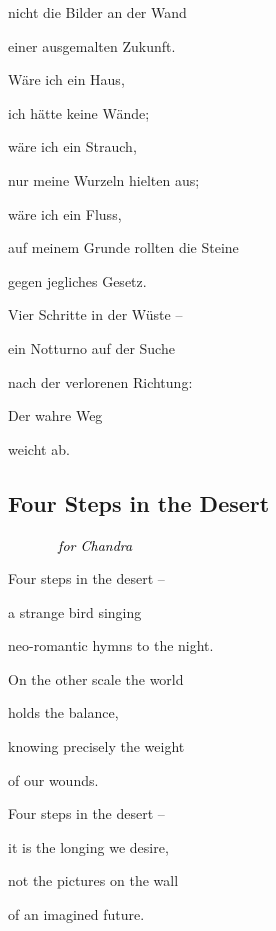 \documentclass[a4paper]{article}
\begin{document}
nicht die Bilder an der Wand

einer ausgemalten Zukunft.


\bigskip

Wäre ich ein Haus,

ich hätte keine Wände;

wäre ich ein Strauch,

nur meine Wurzeln hielten aus;

wäre ich ein Fluss,

auf meinem Grunde rollten die Steine

gegen jegliches Gesetz.


\bigskip

Vier Schritte in der Wüste – 

ein Notturno auf der Suche

nach der verlorenen Richtung:

Der wahre Weg

weicht ab.


\bigskip


\bigskip

\clearpage\subsection[Four Steps in the Desert]{\color{black} Four Steps in the Desert}
\emph{\textup{\textcolor{black}{\ \  \ \ \ \ \ }}}\emph{\textcolor{black}{for Chandra}}


\bigskip

{\color{black}
Four steps in the desert – }

{\color{black}
a strange bird singing}

{\color{black}
neo-romantic hymns to the night.}


\bigskip

{\color{black}
On the other scale the world}

{\color{black}
holds the balance,}

{\color{black}
knowing precisely the weight}

{\color{black}
of our wounds.}


\bigskip

{\color{black}
Four steps in the desert – }

{\color{black}
it is the longing we desire,}

{\color{black}
not the pictures on the wall}

{\color{black}
of an imagined future.}


\bigskip
\end{document}

